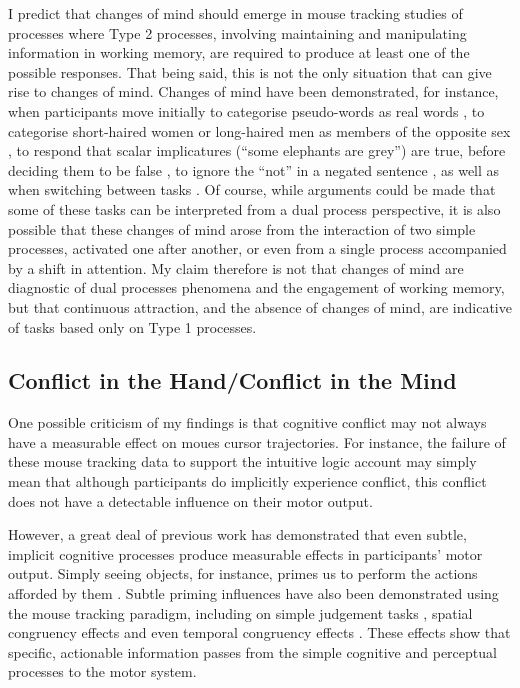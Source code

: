 I predict that changes of mind
should emerge in mouse tracking studies of processes
where Type 2 processes,
involving maintaining and manipulating information in working memory,
are required to produce at least one of the possible responses.
That being said, this is not the only situation
that can give rise to changes of mind.
Changes of mind have been demonstrated, for instance,
when participants move initially
to categorise pseudo-words as real words \citep{Barca2015},
to categorise short-haired women or long-haired  men
as members of the opposite sex
\citep[in contexts where such styles are rare;][]{Freeman2014a},
to respond that scalar implicatures (``some elephants are grey'')
are true, before deciding them to be false \citep{Tomlinson2013},
to ignore the ``not'' in a negated sentence \citep{Dale2011},
as well as when switching between tasks \citep{Hindy2008}.
Of course, while arguments could be made that some of these tasks
can be interpreted from a dual process perspective,
it is also possible that these changes of mind arose from
the interaction of two simple processes, activated one after another,
or even from a single process accompanied by a shift in attention.
My claim therefore is not that changes of mind are
diagnostic of dual processes phenomena
and the engagement of working memory,
but that continuous attraction, and the absence of changes of mind,
are indicative of tasks based only on Type 1 processes.


\subsection{Conflict in the Hand/Conflict in the Mind}

One possible criticism of my findings is that
cognitive conflict may not always have
a measurable effect on moues cursor trajectories.
For instance, the failure of these mouse tracking data
to support the intuitive logic account may simply mean that
although participants do implicitly experience conflict,
this conflict does not have a detectable influence on their motor output.

However, a great deal of previous work has demonstrated that
even subtle, implicit cognitive processes
produce measurable effects in participants' motor output.
Simply seeing objects, for instance, primes us to perform
the actions afforded by them
\citep[their \emph{microaffordances};][]{Ellis2000,Tucker1998,Tucker2004}.
Subtle priming influences have also been demonstrated
using the mouse tracking paradigm,
including on simple judgement tasks \citep{Xiao2014,Finkbeiner2008},
spatial congruency effects \citep{Tower-Richardi2012}
and even temporal congruency effects \citep[i.e. the past is on the left;][]{Miles2010}.
These effects show that specific, actionable information
passes from the simple cognitive and perceptual processes to the motor system.

